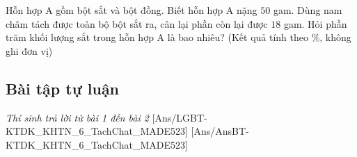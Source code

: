 \documentclass[FileMain.tex]{subfiles}
\begin{document}
\begin{ex}%
	Hỗn hợp A gồm bột sắt và bột đồng. Biết hỗn hợp A nặng $50$ gam. Dùng nam châm tách được toàn bộ bột sắt ra, cân lại phần còn lại được $18$ gam. Hỏi phần trăm khối lượng sắt trong hỗn hợp A là bao nhiêu? (Kết quả tính theo $\%$, không ghi đơn vị)
\end{ex}


\subsection{Bài tập tự luận}\textit{\large Thí sinh trả lời từ bài 1 đến bài 2}
[Ans/LGBT-KTDK_KHTN_6_TachChat_MADE523]
[Ans/AnsBT-KTDK_KHTN_6_TachChat_MADE523]
\end{document}
